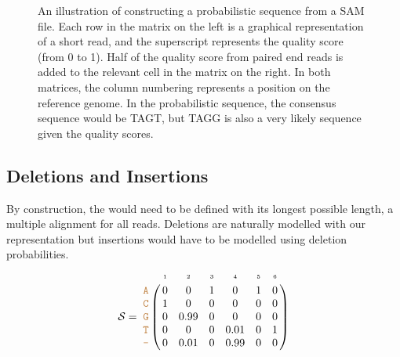 \documentclass[12pt]{article}
\begin{document}
\begin{figure}[h!]
\caption{\label{fig:paired_diagram}An illustration of constructing a probabilistic sequence from a SAM file. Each row in the matrix on the left is a graphical representation of a short read, and the superscript represents the quality score (from 0 to 1). Half of the quality score from paired end reads is added to the relevant cell in the matrix on the right. In both matrices, the column numbering represents a position on the reference genome. In the probabilistic sequence, the consensus sequence would be TAGT, but TAGG is also a very likely sequence given the quality scores.}
\end{figure}

\subsection{Deletions and Insertions}


By construction, the \nlps would need to be defined with its longest possible length, \ie a multiple alignment for all reads.
Deletions are naturally modelled with our representation but insertions would have to be modelled using deletion probabilities. 
\begin{equation}
\label{eq:indel}
\nps = 
\bordermatrix{
&\scriptscriptstyle{1} & \scriptscriptstyle{2}& \scriptscriptstyle{3}& \scriptscriptstyle{4} & \scriptscriptstyle{5} & \scriptscriptstyle{6} \cr
\sq{A} & 0 & 0   & 1 & 0    & 1 & 0\cr
\sq{C} & 1 & 0    & 0 & 0    & 0 & 0\cr
\sq{G} & 0 & 0.99 & 0 & 0    & 0 & 0\cr
\sq{T} & 0 & 0    & 0 & 0.01 & 0 & 1\cr
\sq{-} & 0 & 0.01 & 0 & 0.99 & 0 & 0\cr
}
\end{equation}
\end{document}
